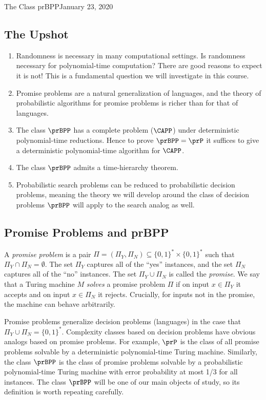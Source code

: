 \begin{lecture}{1}{The Class prBPP}{January 23, 2020}
\label{lec:01}

\subsection*{The Upshot}

\begin{enumerate}
  \item Randomness is necessary in many computational settings. Is randomness
    necessary for polynomial-time computation? There are good reasons to expect
    it is not! This is a fundamental question we will investigate in this
    course.
  \item Promise problems are a natural generalization of languages, and the
    theory of probabilistic algorithms for promise problems is richer than
    for that of languages.
  \item The class $\prBPP$ has a complete problem ($\CAPP$) under deterministic
    polynomial-time reductions. Hence to prove $\prBPP = \prP$ it suffices
    to give a deterministic polynomial-time algorithm for $\CAPP$.
  \item The class $\prBPP$ admits a time-hierarchy theorem.
  \item Probabilistic search problems can be reduced to probabilistic decision
    problems, meaning the theory we will develop around the class of decision
    problems $\prBPP$ will apply to the search analog as well.
\end{enumerate}

\subsection{Promise Problems and prBPP}

A \emph{promise problem} is a pair $\Pi = (\Pi_Y, \Pi_N) \subseteq \{0, 1\}^*
\times \{0, 1\}^*$ such that $\Pi_Y \cap \Pi_N = \emptyset$. The set $\Pi_Y$
captures all of the ``yes'' instances, and the set $\Pi_N$ captures all of the
``no'' instances. The set $\Pi_Y \cup \Pi_N$ is called the \emph{promise}. We
say that a Turing machine $M$ \emph{solves} a promise problem $\Pi$ if on
input $x \in \Pi_Y$ it accepts and on input $x \in \Pi_N$ it rejects. Crucially,
for inputs not in the promise, the machine can behave arbitrarily.

Promise problems generalize decision problems (languages) in the case that
$\Pi_Y \cup \Pi_N = \{0,1\}^*$. Complexity classes based on decision problems
have obvious analogs based on promise problems. For example, $\prP$ is the
class of all promise problems solvable by a deterministic polynomial-time
Turing machine. Similarly, the class $\prBPP$ is the class of promise problems
solvable by a probabilistic polynomial-time Turing machine with error
probability at most 1/3 for all instances. The class $\prBPP$ will be one of
our main objects of study, so its definition is worth repeating carefully.


\end{lecture}
